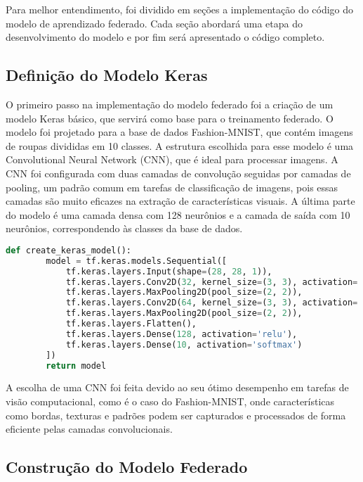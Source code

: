 Para melhor entendimento, foi dividido em seções a implementação do código do modelo de aprendizado federado. Cada seção abordará uma etapa do desenvolvimento do modelo e por fim será apresentado o código completo.

\subsection{Definição do Modelo Keras}

O primeiro passo na implementação do modelo federado foi a criação de um modelo Keras básico, que servirá como base para o treinamento federado. O modelo foi projetado para a base de dados Fashion-MNIST, que contém imagens de roupas divididas em 10 classes. A estrutura escolhida para esse modelo é uma Convolutional Neural Network (CNN), que é ideal para processar imagens. A CNN foi configurada com duas camadas de convolução seguidas por camadas de pooling, um padrão comum em tarefas de classificação de imagens, pois essas camadas são muito eficazes na extração de características visuais. A última parte do modelo é uma camada densa com 128 neurônios e a camada de saída com 10 neurônios, correspondendo às classes da base de dados.

\begin{lstlisting}[language=Python, caption={Função para criar um modelo Keras}, label={lst:create_keras_model}]
    def create_keras_model():
        model = tf.keras.models.Sequential([
            tf.keras.layers.Input(shape=(28, 28, 1)),
            tf.keras.layers.Conv2D(32, kernel_size=(3, 3), activation='relu'),
            tf.keras.layers.MaxPooling2D(pool_size=(2, 2)),
            tf.keras.layers.Conv2D(64, kernel_size=(3, 3), activation='relu'),
            tf.keras.layers.MaxPooling2D(pool_size=(2, 2)),
            tf.keras.layers.Flatten(),
            tf.keras.layers.Dense(128, activation='relu'),
            tf.keras.layers.Dense(10, activation='softmax')
        ])
        return model
\end{lstlisting}
    
A escolha de uma CNN foi feita devido ao seu ótimo desempenho em tarefas de visão computacional, como é o caso do Fashion-MNIST, onde características como bordas, texturas e padrões podem ser capturados e processados de forma eficiente pelas camadas convolucionais.

\subsection{Construção do Modelo Federado}

